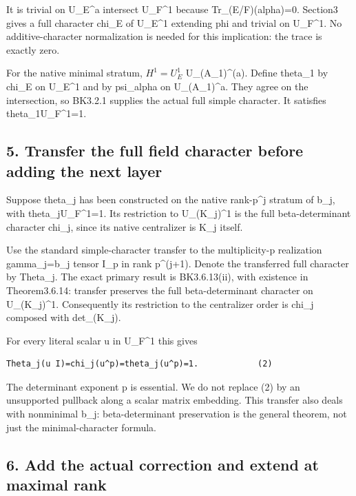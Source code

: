 It is trivial on U\_E\^{}a intersect U\_F\^{}1 because
Tr\_(E/F)(alpha)=0. Section3 gives a full character chi\_E of U\_E\^{}1
extending phi and trivial on U\_F\^{}1. No additive-character
normalization is needed for this implication: the trace is exactly zero.

For the native minimal stratum, \(H^1=U_E^1\)
U\_(A\_1)\^{}(a). Define theta\_1 by chi\_E on U\_E\^{}1 and by
psi\_alpha on U\_(A\_1)\^{}a. They agree on the intersection, so BK3.2.1
supplies the actual full simple character. It satisfies
theta\_1\textbar U\_F\^{}1=1.

\hypertarget{odd_character-transfer-the-full-field-character-before-adding-the-next-layer}{%
\subsection{5. Transfer the full field character before adding the next
layer}\label{odd_character-transfer-the-full-field-character-before-adding-the-next-layer}}

Suppose theta\_j has been constructed on the native rank-p\^{}j stratum
of b\_j, with theta\_j\textbar U\_F\^{}1=1. Its restriction to
U\_(K\_j)\^{}1 is the full beta-determinant character chi\_j, since its
native centralizer is K\_j itself.

Use the standard simple-character transfer to the multiplicity-p
realization gamma\_j=b\_j tensor I\_p in rank p\^{}(j+1). Denote the
transferred full character by Theta\_j. The exact primary result is
BK3.6.13(ii), with existence in Theorem3.6.14: transfer preserves the
full beta-determinant character on U\_(K\_j)\^{}1. Consequently its
restriction to the centralizer order is chi\_j composed with
det\_(K\_j).

For every literal scalar u in U\_F\^{}1 this gives

\begin{Verbatim}[fontsize=\small,breaklines=true,breakanywhere=true]
Theta_j(u I)=chi_j(u^p)=theta_j(u^p)=1.            (2)
\end{Verbatim}

The determinant exponent p is essential. We do not replace (2) by an
unsupported pullback along a scalar matrix embedding. This transfer also
deals with nonminimal b\_j: beta-determinant preservation is the general
theorem, not just the minimal-character formula.

\hypertarget{odd_character-add-the-actual-correction-and-extend-at-maximal-rank}{%
\subsection{6. Add the actual correction and extend at maximal
rank}\label{odd_character-add-the-actual-correction-and-extend-at-maximal-rank}}

